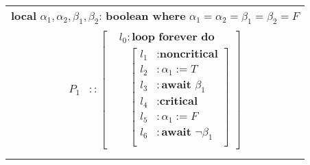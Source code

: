 \documentclass[12pt]{article}
\begin{document}
\begin{center}
\begin{tabular}{|c|}
\hline
\textbf{local} $\alpha_1,\alpha_2,\beta_1,\beta_2$: \textbf{boolean where} $\alpha_1=\alpha_2=\beta_1=\beta_2=F$\\
\parbox{8cm}{\begin{align*}
	P_1 &:: \left[ \begin{aligned}
		&l_0: \textbf{loop forever do } \\ 
 		&\;\;\; \left[ \begin{aligned}
 				l_1 &: \textbf{noncritical}\\ 
 				l_2 &: \alpha_1 := T\\
 				l_3 &: \textbf{await } \beta_1\\
 				l_4 &: \textbf{critical}\\
 				l_5 &: \alpha_1 := F\\
 				l_6 &: \textbf{await } \neg \beta_1\\
			\end{aligned} \right]
		\end{aligned} \right]\\
\end{align*}} \\
$\big{\|}$\\
\parbox{8cm}{\begin{align*}
	A &:: \left[ \begin{aligned}
		&k_0: \textbf{loop forever do } \\ 
 		&\;\;k_1: \left[ \begin{aligned}
 				[k_{1}^{a}&: \textbf{await } \alpha_1; k_2: \beta_1 := T; k_3: \textbf{await } \neg \alpha_1; k_4: \beta_1 := F ]\\ 
 				& \textbf{or}\\
 				[k_{1}^{b}&: \textbf{await } \alpha_2; k_5: \beta_2 := T; k_6: \textbf{await } \neg \alpha_2; k_7: \beta_2 := F ]
			\end{aligned} \right]
		\end{aligned} \right]\\
\end{align*}} \\
$\big{\|}$\\
\parbox{8cm}{\begin{align*}
	P_2 &:: \left[ \begin{aligned}
		&m_0: \textbf{loop forever do } \\ 
 		&\;\;\; \left[ \begin{aligned}
 				m_1 &: \textbf{noncritical}\\ 

\end{aligned}
\end{aligned}
\end{align*}}
\end{tabular}
\end{center}
\end{document}
